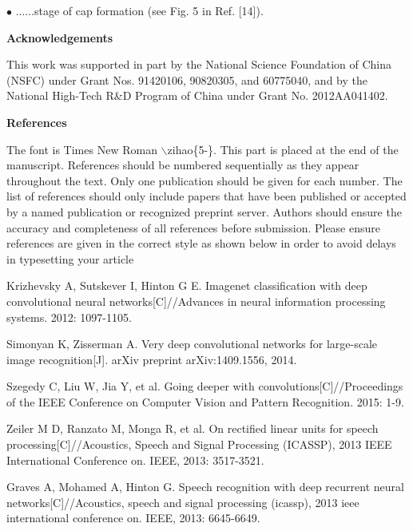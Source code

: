 \documentclass[10.5pt,compsoc]{TsT}
\theoremstyle{mystyle}
\begin{document}
{\setlength{\hangindent}{18pt}
\noindent
  $\bullet$  	......stage of cap formation (see Fig. 5 in Ref. [14]).

\vskip 2mm
\noindent
\textbf{Acknowledgements}
\vskip 2mm

\noindent
This work was supported in part by the National Science Foundation of China (NSFC) under Grant Nos. 91420106, 90820305, and 60775040, and by the National High-Tech R\&D Program of China under Grant No. 2012AA041402.

\vskip 2mm
\noindent
\textbf{References}
\vskip 2mm

\noindent
The font is Times New Roman $\backslash$zihao\{5\--\}. This part is placed at the end of the manuscript. References should be numbered sequentially as they appear throughout the text. Only one publication should be given for each number. The list of references should only include papers that have been published or accepted by a named publication or recognized preprint server. Authors should ensure the accuracy and completeness of all references before submission. Please ensure references are given in the correct style as shown below in order to avoid delays in typesetting your article
\renewcommand\refname{\zihao{5}\textbf{References}}


\begin{thebibliography}{99}
 \addtolength{\itemsep}{-1em}
\vspace {1.5mm}

Krizhevsky A, Sutskever I, Hinton G E. Imagenet classification with deep convolutional neural networks[C]//Advances in neural information processing systems. 2012: 1097-1105.

Simonyan K, Zisserman A. Very deep convolutional networks for large-scale image recognition[J]. arXiv preprint arXiv:1409.1556, 2014.

Szegedy C, Liu W, Jia Y, et al. Going deeper with convolutions[C]//Proceedings of the IEEE Conference on Computer Vision and Pattern Recognition. 2015: 1-9.

Zeiler M D, Ranzato M, Monga R, et al. On rectified linear units for speech processing[C]//Acoustics, Speech and Signal Processing (ICASSP), 2013 IEEE International Conference on. IEEE, 2013: 3517-3521.

Graves A, Mohamed A, Hinton G. Speech recognition with deep recurrent neural networks[C]//Acoustics, speech and signal processing (icassp), 2013 ieee international conference on. IEEE, 2013: 6645-6649.


\end{thebibliography}}
\end{document}
